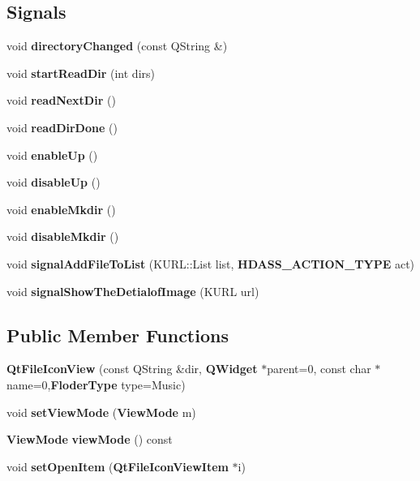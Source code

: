 \subsection*{Signals}
\begin{CompactItemize}
\item 
void {\bf directory\-Changed} (const QString \&)
\item 
void {\bf start\-Read\-Dir} (int dirs)
\item 
void {\bf read\-Next\-Dir} ()
\item 
void {\bf read\-Dir\-Done} ()
\item 
void {\bf enable\-Up} ()
\item 
void {\bf disable\-Up} ()
\item 
void {\bf enable\-Mkdir} ()
\item 
void {\bf disable\-Mkdir} ()
\item 
void {\bf signal\-Add\-File\-To\-List} (KURL::List list, {\bf HDASS\_\-ACTION\_\-TYPE} act)
\item 
void {\bf signal\-Show\-The\-Detialof\-Image} (KURL url)
\end{CompactItemize}
\subsection*{Public Member Functions}
\begin{CompactItemize}
\item 
{\bf Qt\-File\-Icon\-View} (const QString \&dir, {\bf QWidget} $\ast$parent=0, const char $\ast$name=0,{\bf Floder\-Type} type=Music)
\item 
void {\bf set\-View\-Mode} ({\bf View\-Mode} m)
\item 
{\bf View\-Mode} {\bf view\-Mode} () const 
\item 
void {\bf set\-Open\-Item} ({\bf Qt\-File\-Icon\-View\-Item} $\ast$i)
\end{CompactItemize}
